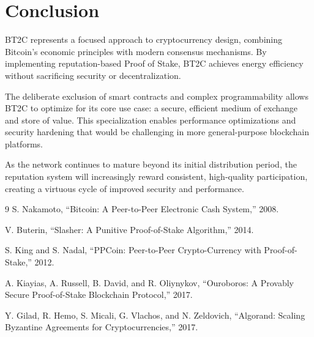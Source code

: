\documentclass[10pt,a4paper]{article}
\begin{document}
\section{Conclusion}
BT2C represents a focused approach to cryptocurrency design, combining Bitcoin's economic principles with modern consensus mechanisms. By implementing reputation-based Proof of Stake, BT2C achieves energy efficiency without sacrificing security or decentralization.

The deliberate exclusion of smart contracts and complex programmability allows BT2C to optimize for its core use case: a secure, efficient medium of exchange and store of value. This specialization enables performance optimizations and security hardening that would be challenging in more general-purpose blockchain platforms.

As the network continues to mature beyond its initial distribution period, the reputation system will increasingly reward consistent, high-quality participation, creating a virtuous cycle of improved security and performance.

\begin{thebibliography}{9}
S. Nakamoto, ``Bitcoin: A Peer-to-Peer Electronic Cash System,'' 2008.

V. Buterin, ``Slasher: A Punitive Proof-of-Stake Algorithm,'' 2014.

S. King and S. Nadal, ``PPCoin: Peer-to-Peer Crypto-Currency with Proof-of-Stake,'' 2012.

A. Kiayias, A. Russell, B. David, and R. Oliynykov, ``Ouroboros: A Provably Secure Proof-of-Stake Blockchain Protocol,'' 2017.

Y. Gilad, R. Hemo, S. Micali, G. Vlachos, and N. Zeldovich, ``Algorand: Scaling Byzantine Agreements for Cryptocurrencies,'' 2017.
\end{thebibliography}
\end{document}
